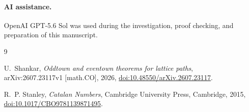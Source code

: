 \documentclass[11pt]{article}
\theoremstyle{definition}
\begin{document}
\paragraph{AI assistance.}
OpenAI GPT-5.6 Sol was used during the investigation, proof checking, and preparation of this manuscript.

\begin{thebibliography}{9}

U.~Shankar,
\emph{Oddtown and eventown theorems for lattice paths},
arXiv:2607.23117v1 [math.CO], 2026, \href{https://doi.org/10.48550/arXiv.2607.23117}{doi:10.48550/arXiv.2607.23117}.

R.~P. Stanley,
\emph{Catalan Numbers},
Cambridge University Press, Cambridge, 2015, \href{https://doi.org/10.1017/CBO9781139871495}{doi:10.1017/CBO9781139871495}.

\end{thebibliography}
\end{document}
